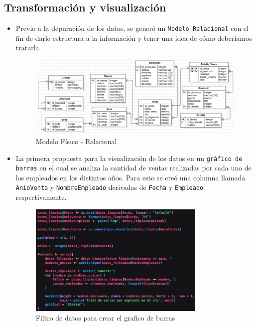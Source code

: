 \documentclass[12pt]{article}
\begin{document}
        \newpage    
        \subsection{Transformación y visualización}
            \begin{itemize}
                \item Previo a la depuración de los datos, se generó un \texttt{Modelo Relacional} con el fin de darle estructura a la información y tener una idea de cómo deberíamos tratarla.
                    \begin{figure}[h]
                        \centering 
                        \includegraphics[width=1\textwidth]{img/transformacion-1.png}
                        \caption{Modelo Físico - Relacional}
                    \end{figure}
                
                \item La primera propuesta para la visualización de los datos en un \texttt{gráfico de barras} en el cual se analiza la cantidad de ventas realizadas por cada uno de los empleados en los distintos años. Para esto se creó una columna llamada \texttt{AnioVenta} y \texttt{NombreEmpleado} derivadas de \texttt{Fecha} y \texttt{Empleado} respectivamente.
                    \begin{figure}[h]
                        \centering 
                        \includegraphics[width=0.8\textwidth]{img/visualizacion-1.png}
                        \caption{Filtro de datos para crear el grafico de barras}
                    \end{figure}


\end{itemize}
\end{document}
